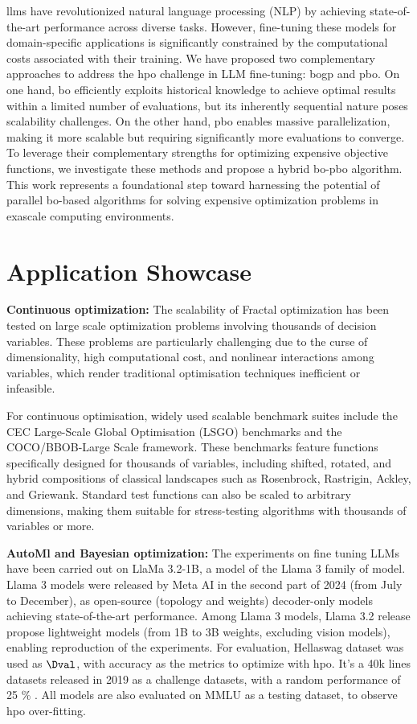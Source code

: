 \acrfull{llm}s have revolutionized natural language processing (NLP) by achieving state-of-the-art performance across diverse tasks. However, fine-tuning these models for domain-specific applications is significantly constrained by the computational costs associated with their training. We have proposed two complementary approaches to address the \acrfull{hpo} challenge in LLM fine-tuning: \acrfull{bogp} and \acrfull{pbo}. On one hand, \acrshort{bo} efficiently exploits historical knowledge to achieve optimal results within a limited number of evaluations, but its inherently sequential nature poses scalability challenges. On the other hand, \acrshort{pbo} enables massive parallelization, making it more scalable but requiring significantly more evaluations to converge. To leverage their complementary strengths for optimizing expensive objective functions, we investigate these methods and propose a hybrid \acrshort{bo}-\acrshort{pbo} algorithm. This work represents a foundational step toward harnessing the potential of parallel \acrlong{bo}-based algorithms for solving expensive optimization problems in exascale computing environments.

\section{Application Showcase}

{\bf Continuous optimization:} The scalability of Fractal optimization has been tested on large scale optimization problems involving thousands of decision variables. These problems are particularly challenging due to the curse of dimensionality, high computational cost, and nonlinear interactions among variables, which render traditional optimisation techniques inefficient or infeasible.

For continuous optimisation, widely used scalable benchmark suites include the CEC Large-Scale Global Optimisation (LSGO) benchmarks and the COCO/BBOB-Large Scale framework. These benchmarks feature functions specifically designed for thousands of variables, including shifted, rotated, and hybrid compositions of classical landscapes such as Rosenbrock, Rastrigin, Ackley, and Griewank. Standard test functions can also be scaled to arbitrary dimensions, making them suitable for stress-testing algorithms with thousands of variables or more.

\medskip

{\bf AutoMl and Bayesian optimization:} The experiments on fine tuning LLMs have been carried out on LlaMa 3.2-1B, a model of the Llama 3 family of model. Llama 3 models were released by Meta AI in the second part of 2024 (from July to December), as open-source (topology and weights) decoder-only models achieving state-of-the-art performance. Among Llama 3 models, Llama 3.2 release propose lightweight models (from 1B to 3B weights, excluding vision models), enabling reproduction of the experiments. For evaluation, Hellaswag dataset was used as $\Dval$, with accuracy as the metrics to optimize with \acrshort{hpo}. It's a 40k lines datasets released in 2019 as a challenge datasets, with a random performance of 25 \% . All models are also evaluated on MMLU as a testing dataset, to observe \acrshort{hpo} over-fitting. 

